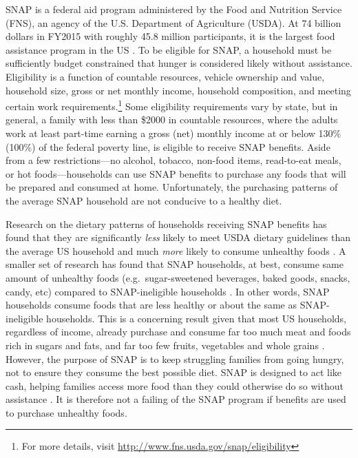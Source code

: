 \documentclass[12pt,letterpaperpaper,]{book}
\begin{document}
SNAP is a federal aid program administered by the Food and Nutrition
Service (FNS), an agency of the U.S. Department of Agriculture (USDA).
At 74 billion dollars in FY2015 with roughly 45.8 million participants,
it is the largest food assistance program in the US
\citep{usda_fns_supplemental_2016}. To be eligible for SNAP, a household
must be sufficiently budget constrained that hunger is considered likely
without assistance. Eligibility is a function of countable resources,
vehicle ownership and value, household size, gross or net monthly
income, household composition, and meeting certain work
requirements.\footnote{For more details, visit
  \url{http://www.fns.usda.gov/snap/eligibility}} Some eligibility
requirements vary by state, but in general, a family with less than
\$2000 in countable resources, where the adults work at least part-time
earning a gross (net) monthly income at or below 130\% (100\%) of the
federal poverty line, is eligible to receive SNAP benefits. Aside from a
few restrictions---no alcohol, tobacco, non-food items, read-to-eat
meals, or hot foods---households can use SNAP benefits to purchase any
foods that will be prepared and consumed at home. Unfortunately, the
purchasing patterns of the average SNAP household are not conducive to a
healthy diet.

Research on the dietary patterns of households receiving SNAP benefits
has found that they are significantly \emph{less} likely to meet USDA
dietary guidelines than the average US household and much \emph{more}
likely to consume unhealthy foods
\citep{andreyeva_dietary_2015, nguyen_supplemental_2015, wolfson_fruit_2015}.
A smaller set of research has found that SNAP households, at best,
consume same amount of unhealthy foods (e.g.~sugar-sweetened beverages,
baked goods, snacks, candy, etc) compared to SNAP-ineligible households
\citep{todd_caloric_2014, hoynes_snap_2015}. In other words, SNAP
households consume foods that are less healthy or about the same as
SNAP-ineligible households. This is a concerning result given that most
US households, regardless of income, already purchase and consume far
too much meat and foods rich in sugars and fats, and far too few fruits,
vegetables and whole grains
\citep{usda_scientific_2015, frazao_high_1999}. However, the purpose of
SNAP is to keep struggling families from going hungry, not to ensure
they consume the best possible diet. SNAP is designed to act like cash,
helping families access more food than they could otherwise do so
without assistance \citep{hoynes_snap_2015}. It is therefore not a
failing of the SNAP program if benefits are used to purchase unhealthy
foods.
\end{document}
